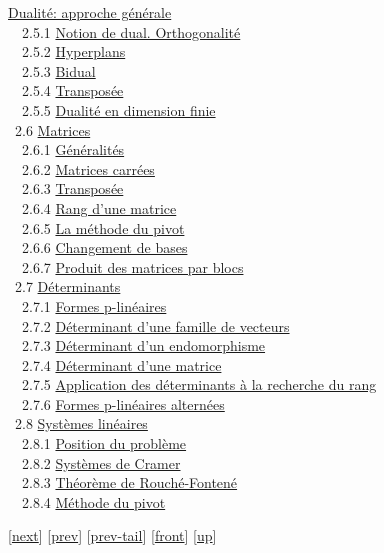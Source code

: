 \documentclass[]{article}
\begin{document}
\href{coursse11.html\#x16-750002.5}{Dualité: approche générale} \\
~~2.5.1 \href{coursse11.html\#x16-760002.5.1}{Notion de dual.
Orthogonalité} \\ ~~2.5.2
\href{coursse11.html\#x16-770002.5.2}{Hyperplans} \\ ~~2.5.3
\href{coursse11.html\#x16-780002.5.3}{Bidual} \\ ~~2.5.4
\href{coursse11.html\#x16-790002.5.4}{Transposée} \\ ~~2.5.5
\href{coursse11.html\#x16-800002.5.5}{Dualité en dimension finie} \\
~2.6 \href{coursse12.html\#x17-810002.6}{Matrices} \\ ~~2.6.1
\href{coursse12.html\#x17-820002.6.1}{Généralités} \\ ~~2.6.2
\href{coursse12.html\#x17-830002.6.2}{Matrices carrées} \\ ~~2.6.3
\href{coursse12.html\#x17-840002.6.3}{Transposée} \\ ~~2.6.4
\href{coursse12.html\#x17-850002.6.4}{Rang d'une matrice} \\ ~~2.6.5
\href{coursse12.html\#x17-860002.6.5}{La méthode du pivot} \\ ~~2.6.6
\href{coursse12.html\#x17-870002.6.6}{Changement de bases} \\ ~~2.6.7
\href{coursse12.html\#x17-880002.6.7}{Produit des matrices par blocs} \\
~2.7 \href{coursse13.html\#x18-890002.7}{Déterminants} \\ ~~2.7.1
\href{coursse13.html\#x18-900002.7.1}{Formes p-linéaires} \\ ~~2.7.2
\href{coursse13.html\#x18-910002.7.2}{Déterminant d'une famille de
vecteurs} \\ ~~2.7.3 \href{coursse13.html\#x18-920002.7.3}{Déterminant
d'un endomorphisme} \\ ~~2.7.4
\href{coursse13.html\#x18-930002.7.4}{Déterminant d'une matrice} \\
~~2.7.5 \href{coursse13.html\#x18-940002.7.5}{Application des
déterminants à la recherche du rang} \\ ~~2.7.6
\href{coursse13.html\#x18-950002.7.6}{Formes p-linéaires alternées} \\
~2.8 \href{coursse14.html\#x19-960002.8}{Systèmes linéaires} \\ ~~2.8.1
\href{coursse14.html\#x19-970002.8.1}{Position du problème} \\ ~~2.8.2
\href{coursse14.html\#x19-980002.8.2}{Systèmes de Cramer} \\ ~~2.8.3
\href{coursse14.html\#x19-990002.8.3}{Théorème de Rouché-Fontené} \\
~~2.8.4 \href{coursse14.html\#x19-1000002.8.4}{Méthode du pivot}

{[}\href{coursch4.html}{next}{]} {[}\href{coursch2.html}{prev}{]}
{[}\href{coursch2.html\#tailcoursch2.html}{prev-tail}{]}
{[}\href{coursch3.html}{front}{]}
{[}\href{cours.html\#coursch3.html}{up}{]}
\end{document}
